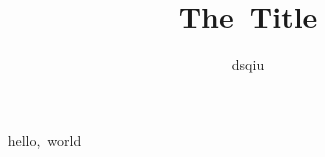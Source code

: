 \documentclass{book}
\author{dsqiu}
\title{The Title}
\begin{document}
\maketitle 
hello, world %
\end{document}

